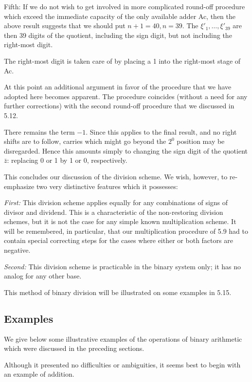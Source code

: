 \documentclass[12pt]{amsart}
\begin{document}
Fifth: If we do not wish to get involved in more complicated round-off procedure which exceed the immediate capacity of the only available adder Ac, then the above result suggests that we should put $n + 1 = 40, n = 39$. The $\xi'_1, \dots, \xi'_{39}$ are then 39 digits of the quotient, including the sign digit, but not including the right-most digit.

The right-most digit is taken care of by placing a 1 into the right-most stage of Ac.

At this point an additional argument in favor of the procedure that we have adopted here becomes apparent. The procedure coincides (without a need for any further corrections) with the second round-off procedure that we discussed in 5.12.

There remains the term $-1$. Since this applies to the final result, and no right shifts are to follow, carries which might go beyond the $2^0$ position may be disregarded. Hence this amounts simply to changing the sign digit of the quotient $\bar{z}$: replacing 0 or 1 by 1 or 0, respectively.

This concludes our discussion of the division scheme. We wish, however, to re-emphasize two very distinctive features which it possesses:

\emph{First:} This division scheme applies equally for any combinations of signs of divisor and dividend. This is a characteristic of the non-restoring division schemes, but it is not the case for any simple known multiplication scheme. It will be remembered, in particular, that our multiplication procedure of 5.9 had to contain special correcting steps for the cases where either or both factors are negative.

\emph{Second:} This division scheme is practicable in the binary system only; it has no analog for any other base.

This method of binary division will be illustrated on some examples in 5.15.

\subsection{Examples}
We give below some illustrative examples of the operations of binary arithmetic which were discussed in the preceding sections.

Although it presented no difficulties or ambiguities, it seems best to begin with an example of addition.
\raggedbottom
\end{document}
